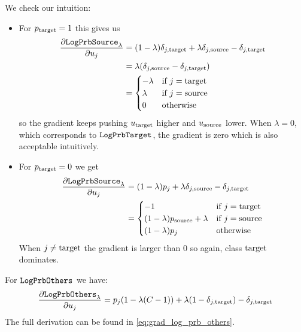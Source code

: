 \documentclass[../main.tex]{subfiles}
\begin{document}
We check our intuition:
\begin{itemize}
    \item For $p_{\mathrm{target}} = 1$ this gives us
          \begin{align*}
              \frac{\partial \mathtt{LogPrbSource}_{\lambda}}{\partial u_j}
               & = (1 - \lambda) \delta_{j, \mathrm{target}} + \lambda \delta_{j, \mathrm{source}} - \delta_{j, \mathrm{target}} \\
               & = \lambda(\delta_{j, \mathrm{source}} - \delta_{j, \mathrm{target}})                     \\
               & = \begin{cases}
                       -\lambda & \text{if } j = \mathrm{target} \\
                       \lambda  & \text{if } j = \mathrm{source} \\
                       0        & \text{otherwise}
                   \end{cases}
          \end{align*}
so the gradient keeps pushing $u_{\mathrm{target}}$ higher and $u_{\mathrm{source}}$ lower.
          When $\lambda = 0$, which corresponds to $\mathtt{LogPrbTarget}$, the gradient is zero which is also acceptable intuitively.

    \item For $p_{\mathrm{target}} = 0$ we get
          \begin{align*}
              \frac{\partial \mathtt{LogPrbSource}_{\lambda}}{\partial u_j}
               & = (1 - \lambda) p_j + \lambda \delta_{j, \mathrm{source}} - \delta_{j, \mathrm{target}}                 \\
               & = \begin{cases}
-1                 & \text{if } j = \mathrm{target} \\
                       (1-\lambda)p_{\mathrm{source}} + \lambda & \text{if } j = \mathrm{source} \\
                       (1 - \lambda) p_j              & \text{otherwise}
                   \end{cases}
          \end{align*}
When $j \neq \mathrm{target}$ the gradient is larger than 0 so again, class $\mathrm{target}$ dominates.
\end{itemize}

For $\mathtt{LogPrbOthers}_{}$ we have:
\begin{align*}
    \frac{\partial \mathtt{LogPrbOthers}_{\lambda}}{\partial u_j}
     = p_j (1 - \lambda (C - 1)) + \lambda (1 - \delta_{j, \mathrm{target}}) - \delta_{j, \mathrm{target}}
\end{align*}
The full derivation can be found in \autoref{eq:grad_log_prb_others}.
\end{document}
